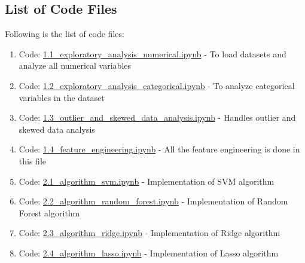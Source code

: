\documentclass[sigconf]{acmart}
\begin{document}
    \subsection{List of Code Files}    
    Following is the list of code files:
    \begin{enumerate}
    	\item Code: \href{https://github.com/bigdata-i523/hid306/blob/master/project/code/1.1_exploratory_analysis_numerical.ipynb}{1.1\_exploratory\_analysis\_numerical.ipynb} - To load datasets and analyze all numerical variables
    	
    	\item Code: \href{https://github.com/bigdata-i523/hid306/blob/master/project/code/1.2_exploratory_analysis_categorical.ipynb}{1.2\_exploratory\_analysis\_categorical.ipynb} - To analyze categorical variables in the dataset
    	
    	\item Code: \href{https://github.com/bigdata-i523/hid306/blob/master/project/code/1.3_outlier_and_skewed_data_analysis.ipynb}{1.3\_outlier\_and\_skewed\_data\_analysis.ipynb} - Handles outlier and skewed data analysis
    	
    	\item Code: \href{https://github.com/bigdata-i523/hid306/blob/master/project/code/1.4_feature_engineering.ipynb}{1.4\_feature\_engineering.ipynb} - All the feature engineering is done in this file
    	
    	\item Code: \href{https://github.com/bigdata-i523/hid306/blob/master/project/code/2.1_algorithm_svm.ipynb}{2.1\_algorithm\_svm.ipynb} - Implementation of SVM algorithm
    	
    	\item Code: \href{https://github.com/bigdata-i523/hid306/blob/master/project/code/2.2_algorithm_random_forest.ipynb}{2.2\_algorithm\_random\_forest.ipynb} - Implementation of Random Forest algorithm
    	
    	\item Code: \href{https://github.com/bigdata-i523/hid306/blob/master/project/code/2.3_algorithm_ridge.ipynb}{2.3\_algorithm\_ridge.ipynb} - Implementation of Ridge algorithm
    	
    	\item Code: \href{https://github.com/bigdata-i523/hid306/blob/master/project/code/2.4_algorithm_lasso.ipynb}{2.4\_algorithm\_lasso.ipynb} - Implementation of Lasso algorithm
    	

\end{enumerate}
\end{document}
